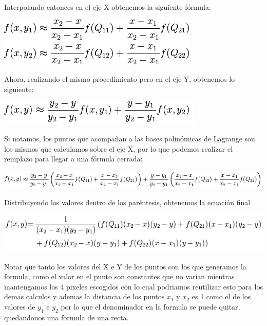 Interpolando entonces en el eje X obtenemos la siguiente fórmula:

\begin{center}
\includegraphics[scale=0.75]{imagenes/bilinealX.png}\\
\end{center}


Ahora, realizando el mismo procedimiento pero en el eje Y, obtenemos lo siguiente:

\begin{center}
\includegraphics[scale=0.75]{imagenes/bilinealY.png}\\
\end{center}

Si notamos, los puntos que acompañan a las bases polinómicas de Lagrange son los mismos que calculamos sobre el eje X, por lo que podemos realizar el remplazo para llegar a una fórmula cerrada:

\begin{center}
\includegraphics[scale=0.75]{imagenes/bilinealXY.png}\\
\end{center}

Distribuyendo los valores dentro de los paréntesis, obtenemos la ecuación final

\begin{center}
\includegraphics[scale=0.75]{imagenes/bilinealFinal.png}\\
\end{center}

Notar que tanto los valores del X e Y de los puntos con los que generamos la formula, como el valor en el punto son constantes que no varian mientras mantengamos los 4 pixeles escogidos con lo cual podriamos reutilizar esto para los demas calculos y ademas la distancia de los puntos $x_1$ y $x_2$ es 1 como el de los valores de $y_1$ e $y_2$ por lo que el denominador en la formula se puede quitar, quedandonos una formula de una recta. 

